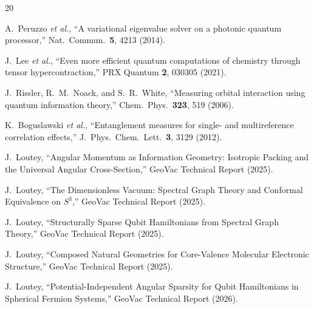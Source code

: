 \documentclass[twocolumn,pra,amsmath,amssymb,superscriptaddress]{revtex4-2}
\begin{document}
\begin{thebibliography}{20}

A.~Peruzzo \textit{et al.},
``A variational eigenvalue solver on a photonic quantum processor,''
Nat.\ Commun.\ \textbf{5}, 4213 (2014).

J.~Lee \textit{et al.},
``Even more efficient quantum computations of chemistry through
tensor hypercontraction,''
PRX Quantum \textbf{2}, 030305 (2021).

J.~Rissler, R.~M.~Noack, and S.~R.~White,
``Measuring orbital interaction using quantum information theory,''
Chem.\ Phys.\ \textbf{323}, 519 (2006).

K.~Boguslawski \textit{et al.},
``Entanglement measures for single- and multireference correlation
effects,''
J.\ Phys.\ Chem.\ Lett.\ \textbf{3}, 3129 (2012).

J.~Loutey,
``Angular Momentum as Information Geometry: Isotropic Packing and
the Universal Angular Cross-Section,''
GeoVac Technical Report (2025).

J.~Loutey,
``The Dimensionless Vacuum: Spectral Graph Theory and Conformal
Equivalence on $S^3$,''
GeoVac Technical Report (2025).

J.~Loutey,
``Structurally Sparse Qubit Hamiltonians from Spectral Graph Theory,''
GeoVac Technical Report (2025).

J.~Loutey,
``Composed Natural Geometries for Core-Valence Molecular
Electronic Structure,''
GeoVac Technical Report (2025).

J.~Loutey,
``Potential-Independent Angular Sparsity for Qubit Hamiltonians
in Spherical Fermion Systems,''
GeoVac Technical Report (2026).

\end{thebibliography}
\end{document}
